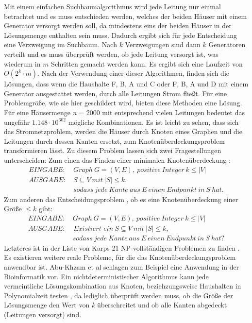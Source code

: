 Mit einem einfachen Suchbaumalgorithmus wird jede Leitung nur einmal betrachtet und es muss entschieden werden, welches der beiden Häuser mit einem Generator versorgt werden soll, da mindestens eins der beiden Häuser in der Lösungsmenge enthalten sein muss. Dadurch ergibt sich für jede Entscheidung eine Verzweigung im Suchbaum. Nach $k$ Verzweigungen sind dann $k$ Generatoren verteilt und es muss überprüft werden, ob jede Leitung versorgt ist, was wiederum in $m$ Schritten gemacht werden kann. Es ergibt sich eine Laufzeit von $O(2^{k} \cdot m)$. 
Nach der Verwendung einer dieser Algorithmen, finden sich die Lösungen, dass wenn die Haushalte F, B, A und C oder F, B, A und D mit einem Generator ausgestattet werden, durch alle Leitungen Strom fließt. Für eine Problemgröße, wie sie hier geschildert wird, bieten diese Methoden eine Lösung. Für eine Häusermenge \emph{n} = 2000 mit entsprechend vielen Leitungen bedeutet das ungefähr $1.148 \cdot 10^{602}$ mögliche Kombinationen.
Es ist leicht zu sehen, dass sich das Stromnetzproblem, werden die Häuser durch Knoten eines Graphen und die Leitungen durch dessen Kanten ersetzt, zum Knotenüberdeckungsproblem transformieren lässt. Zu diesem Problem lassen sich zwei Fragestellungen unterscheiden: Zum einen das Finden einer minimalen Knotenüberdeckung \cite{trees}:
\begin{align*}
EINGABE: &\ Graph\ G=(V,E),\ positive\ Integer\ k\leq |V|\\
AUSGABE: &\ S\subseteq V\ mit\ |S|\leq k,\\
&\ sodass\ jede\ Kante\ aus\ E\ einen\ Endpunkt\ in\ S\ hat.
\end{align*}
Zum anderen das Entscheidungsproblem \cite{exakt}, ob es eine Knotenüberdeckung einer Größe $\leq k$ gibt:
\begin{align*}
EINGABE: &\ Graph\ G=(V,E),\ positive\ Integer\ k\leq |V|\\
AUSGABE: &\textit{ Existiert ein}\ S\subseteq V\ mit\ |S|\leq k,\\
&\ sodass\ jede\ Kante\ aus\ E\ einen\ Endpunkt\ in\ S\ hat?
\end{align*}
Letzteres ist in der Liste von Karps 21 NP-vollständigen Problemen zu finden \cite{karp}.
Es existieren weitere reale Probleme, für die das Knotenüberdeckungsproblem anwendbar ist. Abu-Khzam et al \cite{paper:3} schlagen zum Beispiel eine Anwendung in der Bioinformatik vor.
Ein nichtdeterministischer Algorithmus kann jede vermeintliche Lösungskombination aus Knoten, beziehzungsweise Haushalten in Polynomialzeit testen \cite{intract}, da lediglich überprüft werden muss, ob die Größe der Lösungsmenge den Wert von \emph{k} überschreitet und ob alle Kanten abgedeckt (Leitungen versorgt) sind.

